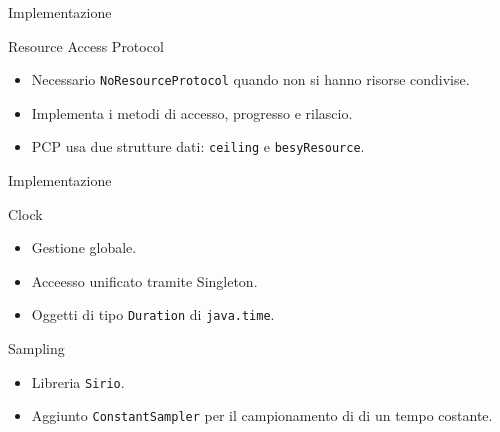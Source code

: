 \begin{frame}{Implementazione}
    \begin{block}{Resource Access Protocol}
        \begin{itemize}
            \item Necessario \texttt{NoResourceProtocol} quando non si hanno risorse condivise.
            \item Implementa i metodi di accesso, progresso e rilascio.
            \item PCP usa due strutture dati: \texttt{ceiling} e \texttt{besyResource}.
        \end{itemize}
    \end{block}
\end{frame}

\begin{frame}{Implementazione}
    \begin{block}{Clock}
        \begin{itemize}
            \item Gestione globale.
            \item Acceesso unificato tramite Singleton.
            \item Oggetti di tipo \texttt{Duration} di \texttt{java.time}.
        \end{itemize}
    \end{block}
    \begin{block}{Sampling}
        \begin{itemize}
            \item Libreria \texttt{Sirio}.
            \item Aggiunto \texttt{ConstantSampler} per il campionamento di di un tempo costante.
        \end{itemize}
    \end{block}
\end{frame}